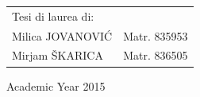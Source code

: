 \begin{titlepage}
\begin{flushright}
\begin{tabular}{ll}
Tesi di laurea di: & \tabularnewline
Milica JOVANOVI\'{C} & Matr. 835953\tabularnewline
Mirjam \v{S}KARICA & Matr. 836505\tabularnewline
\end{tabular}\vspace{2.2cm}

\par\end{flushright}

\begin{center}
{\large{}Academic Year 2015}
\par\end{center}{\large \par}

\end{titlepage}
